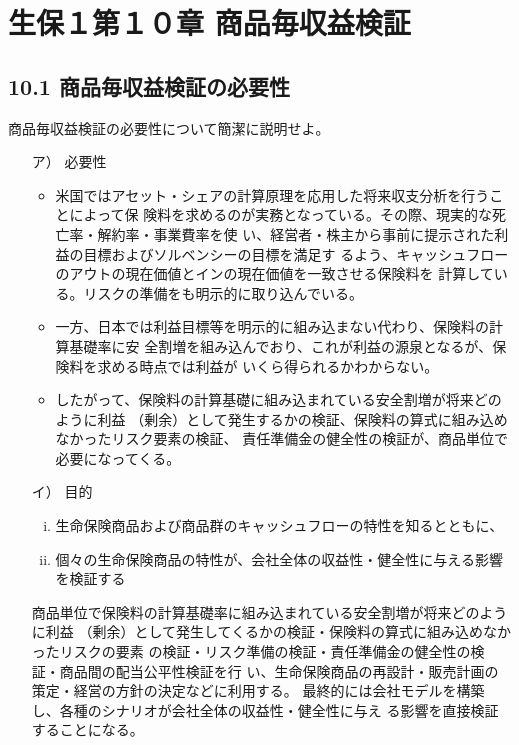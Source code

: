 \documentclass[report,gutter=10mm,fore-edge=10mm,uplatex,dvipdfmx]{jlreq}
\begin{document}
\chapter{生保１第１０章 商品毎収益検証}
\section{10.1 商品毎収益検証の必要性}
商品毎収益検証の必要性について簡潔に説明せよ。

\begin{itemize}
 \item [ア）] 必要性
\begin{itemize}
 \item 
米国ではアセット・シェアの計算原理を応用した将来収支分析を行うことによって保
険料を求めるのが実務となっている。その際、現実的な死亡率・解約率・事業費率を使
い、経営者・株主から事前に提示された利益の目標およびソルベンシーの目標を満足す
るよう、キャッシュフローのアウトの現在価値とインの現在価値を一致させる保険料を
計算している。リスクの準備をも明示的に取り込んでいる。
 \item 
一方、日本では利益目標等を明示的に組み込まない代わり、保険料の計算基礎率に安
全割増を組み込んでおり、これが利益の源泉となるが、保険料を求める時点では利益が
いくら得られるかわからない。
 \item 
したがって、保険料の計算基礎に組み込まれている安全割増が将来どのように利益
（剰余）として発生するかの検証、保険料の算式に組み込めなかったリスク要素の検証、
責任準備金の健全性の検証が、商品単位で必要になってくる。
\end{itemize}

 \item [イ）] 目的

\begin{enumerate} [(i))]
 \item 生命保険商品および商品群のキャッシュフローの特性を知るとともに、
 \item 個々の生命保険商品の特性が、会社全体の収益性・健全性に与える影響を検証する
\end{enumerate}

商品単位で保険料の計算基礎率に組み込まれている安全割増が将来どのように利益
（剰余）として発生してくるかの検証・保険料の算式に組み込めなかったリスクの要素
の検証・リスク準備の検証・責任準備金の健全性の検証・商品間の配当公平性検証を行
い、生命保険商品の再設計・販売計画の策定・経営の方針の決定などに利用する。
最終的には会社モデルを構築し、各種のシナリオが会社全体の収益性・健全性に与え
る影響を直接検証することになる。

\end{itemize}
\end{document}
